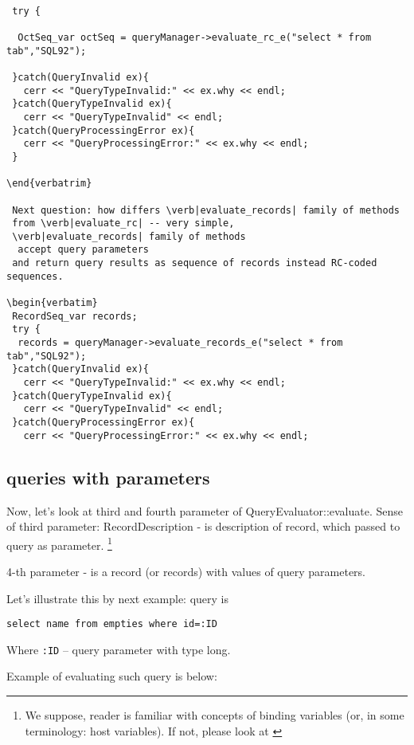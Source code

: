 \documentclass[10pt]{article}
\begin{document}
\begin{verbatim}

 try {

  OctSeq_var octSeq = queryManager->evaluate_rc_e("select * from tab","SQL92");

 }catch(QueryInvalid ex){
   cerr << "QueryTypeInvalid:" << ex.why << endl;
 }catch(QueryTypeInvalid ex){
   cerr << "QueryTypeInvalid" << endl;
 }catch(QueryProcessingError ex){
   cerr << "QueryProcessingError:" << ex.why << endl;
 }

\end{verbatrim}

 Next question: how differs \verb|evaluate_records| family of methods 
 from \verb|evaluate_rc| -- very simple, 
 \verb|evaluate_records| family of methods
  accept query parameters 
 and return query results as sequence of records instead RC-coded sequences.

\begin{verbatim}
 RecordSeq_var records;
 try {
  records = queryManager->evaluate_records_e("select * from tab","SQL92");
 }catch(QueryInvalid ex){
   cerr << "QueryTypeInvalid:" << ex.why << endl;
 }catch(QueryTypeInvalid ex){
   cerr << "QueryTypeInvalid" << endl;
 }catch(QueryProcessingError ex){
   cerr << "QueryProcessingError:" << ex.why << endl;
 \end{verbatim}
 

\subsection{ queries with parameters  }

 Now, let's look at third and fourth parameter of QueryEvaluator::evaluate.
 Sense of third parameter: RecordDescription - is description of record,
 which passed to query as parameter.
 \footnote{
 We suppose, reader is familiar with concepts of binding variables (or,
  in some terminology: host variables). If not, please look at
 \cite{ORACLE-1}
}

 4-th parameter - is a record (or records) with values of query
 parameters.

 Let's illustrate this by next example:
 query is
\begin{verbatim}
select name from empties where id=:ID
\end{verbatim}

 Where \verb|:ID| -- query parameter with type long.

 Example of evaluating such query is below:
\end{document}
